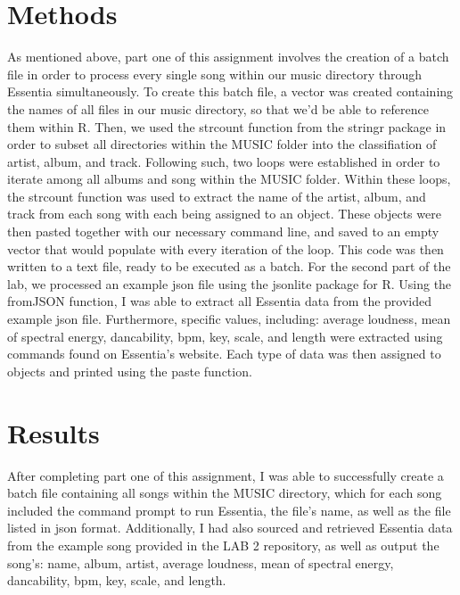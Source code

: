 \documentclass{article}\usepackage[]{graphicx}\usepackage[]{xcolor}
\begin{document}
\begin{multicols}{2}
\section{Methods}
 As mentioned above, part one of this assignment involves the creation of a batch file in order to process every single song within our music directory through Essentia simultaneously. To create this batch file, a vector was created containing the names of all files in our music directory, so that we'd be able to reference them within R. Then, we used the strcount function from the stringr package \citep{stringr} in order to subset all directories within the MUSIC folder into the classifiation of artist, album, and track. Following such, two loops were established in order to iterate among all albums and song within the MUSIC folder. Within these loops, the strcount function was used to extract the name of the artist, album, and track from each song with each being assigned to an object. These objects were then pasted together with our necessary command line, and saved to an empty vector that would populate with every iteration of the loop. This code was then written to a text file, ready to be executed as a batch. For the second part of the lab, we processed an example json file using the jsonlite package for R. Using the fromJSON function, I was able to extract all Essentia data from the provided example json file. Furthermore, specific values, including: average loudness, mean of spectral energy, dancability, bpm, key, scale, and length were extracted using commands found on Essentia's website. Each type of data was then assigned to objects and printed using the paste function.
 


\section{Results}
 After completing part one of this assignment, I was able to successfully create a batch file containing all songs within the MUSIC directory, which for each song included the command prompt to run Essentia, the file's name, as well as the file listed in json format. Additionally, I had also sourced and retrieved Essentia data from the example song provided in the LAB 2 repository, as well as output the song's: name, album, artist, average loudness, mean of spectral energy, dancability, bpm, key, scale, and length.




\vspace{2em}



\begin{tiny}

\end{tiny}
\end{multicols}
\end{document}
